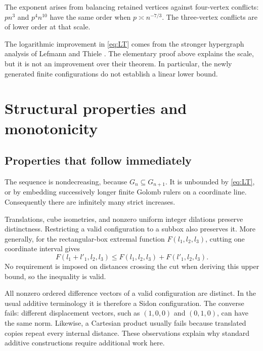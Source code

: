 \documentclass[11pt,letterpaper]{article}
\theoremstyle{definition}
\begin{document}
The exponent arises from balancing retained vertices against
four-vertex conflicts: \(pn^3\) and \(p^4n^{10}\) have the same
order when \(p\asymp n^{-7/3}\). The three-vertex conflicts are of
lower order at that scale.

The logarithmic improvement in \cref{eq:LT} comes from the stronger
hypergraph analysis of Lefmann and Thiele \cite{lt,ltreport}. The
elementary proof above explains the scale, but it is not an improvement
over their theorem. In particular, the newly generated finite
configurations do not establish a linear lower bound.

\section{Structural properties and monotonicity}
\label{sec:structure}

\subsection{Properties that follow immediately}
The sequence is nondecreasing, because \(G_n\subseteq G_{n+1}\).
It is unbounded by \cref{eq:LT}, or by embedding successively longer
finite Golomb rulers on a coordinate line. Consequently there are
infinitely many strict increases.

Translations, cube isometries, and nonzero uniform integer dilations
preserve distinctness. Restricting a valid configuration to a subbox
also preserves it. More generally, for the rectangular-box extremal
function \(F(l_1,l_2,l_3)\), cutting one coordinate interval gives
\[
 F(l_1+l'_1,l_2,l_3)
 \le F(l_1,l_2,l_3)+F(l'_1,l_2,l_3).
\]
No requirement is imposed on distances crossing the cut when deriving
this upper bound, so the inequality is valid.

All nonzero ordered difference vectors of a valid configuration are
distinct. In the usual additive terminology it is therefore a Sidon
configuration. The converse fails: different displacement vectors,
such as \((1,0,0)\) and \((0,1,0)\), can have the same norm.
Likewise, a Cartesian product usually fails because translated copies
repeat every internal distance. These observations explain why
standard additive constructions require additional work here.
\end{document}
